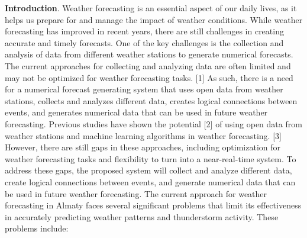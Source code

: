 \textbf{Introduction}. Weather forecasting is an essential aspect of our
daily lives, as it helps us prepare for and manage the impact of weather
conditions. While weather forecasting has improved in recent years,
there are still challenges in creating accurate and timely forecasts.
One of the key challenges is the collection and analysis of data from
different weather stations to generate numerical forecasts. The current
approaches for collecting and analyzing data are often limited and may
not be optimized for weather forecasting tasks. {[}1{]} As such, there
is a need for a numerical forecast generating system that uses open data
from weather stations, collects and analyzes different data, creates
logical connections between events, and generates numerical data that
can be used in future weather forecasting. Previous studies have shown
the potential {[}2{]} of using open data from weather stations and
machine learning algorithms in weather forecasting. {[}3{]} However,
there are still gaps in these approaches, including optimization for
weather forecasting tasks and flexibility to turn into a near-real-time
system. To address these gaps, the proposed system will collect and
analyze different data, create logical connections between events, and
generate numerical data that can be used in future weather forecasting.
The current approach for weather forecasting in Almaty faces several
significant problems that limit its effectiveness in accurately
predicting weather patterns and thunderstorm activity. These problems
include:

